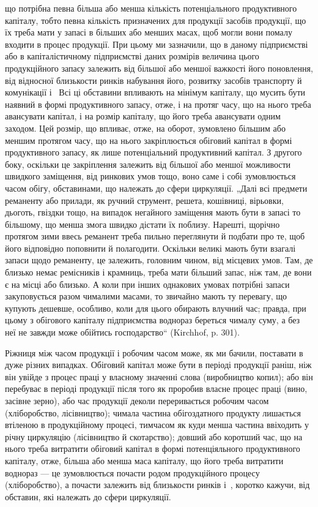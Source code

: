 \parcont{}  %
що потрібна певна більша або менша кількість потенціального продуктивного капіталу, тобто певна
кількість призначених для продукції засобів продукції, що їх треба мати у запасі в більших або
менших масах, щоб могли вони помалу входити в процес продукції. При цьому ми зазначили, що в даному
підприємстві або в капіталістичному підприємстві даних розмірів величина цього продукційного запасу
залежить від більшої або меншої важкості його поновлення, від відносної близькости ринків набування
його, розвитку засобів транспорту й комунікації і~ Всі ці обставини впливають на мінімум
капіталу, що мусить бути наявний в формі продуктивного запасу, отже, і на протяг часу, що на нього
треба авансувати капітал, і на розмір капіталу, що його треба авансувати одним заходом. Цей розмір,
що впливає, отже, на оборот, зумовлено більшим або меншим протягом часу, що на нього закріплюється
обіговий капітал в формі продуктивного запасу, як лише потенціальний продуктивний капітал. З другого
боку, оскільки це закріплення залежить від більшої або меншої можливости швидкого заміщення, від
ринкових умов тощо, воно саме і собі зумовлюється часом обігу, обставинами, що належать до сфери
циркуляції. „Далі всі предмети реманенту або прилади, як ручний струмент, решета, кошівниці,
вірьовки, дьоготь, гвіздки тощо, на випадок негайного заміщення мають бути в запасі то більшому, що
менша змога швидко дістати їх поблизу. Нарешті, щорічно протягом зими ввесь реманент треба пильно
переглянути й подбати про те, щоб його відповідно поповнити й полагодити. Оскільки великі мають бути
взагалі запаси щодо реманенту, це залежить, головним чином, від місцевих умов. Там, де близько немає
ремісників і крамниць, треба мати більший запас, ніж там, де вони є на місці або близько. А коли при
інших однакових умовах потрібні запаси закуповується разом чималими масами, то звичайно мають ту
перевагу, що купують дешевше, особливо, коли для цього обирають влучний час; правда, при цьому з
обігового капіталу підприємства воднораз береться чималу суму, а без неї не завжди може обійтись
господарство“ (Kirchhof, p. 301).

Ріжниця між часом продукції і робочим часом може, як ми бачили, поставати в дуже різних випадках.
Обіговий капітал може бути в періоді продукції раніш, ніж він увійде з процес праці у власному
значенні слова (виробництво копил); або він перебуває в періоді продукції після того як проробив
власне процес праці (вино, засівне зерно), або час продукції деколи переривається робочим часом
(хліборобство, лісівництво); чимала частина обігоздатного продукту лишається втіленою в
продукційному процесі, тимчасом як куди менша частина ввіходить у річну циркуляцію (лісівництво й
скотарство); довший або коротший час, що на нього треба витратити обіговий капітал в формі
потенціяльного продуктивного капіталу, отже, більша або менша маса капіталу, що його треба витратити
воднораз — це зумовлюється почасти родом продукційного процесу (хліборобство), а почасти залежить
від близькости ринків і~, коротко кажучи, від обставин, які належать до сфери циркуляції.

